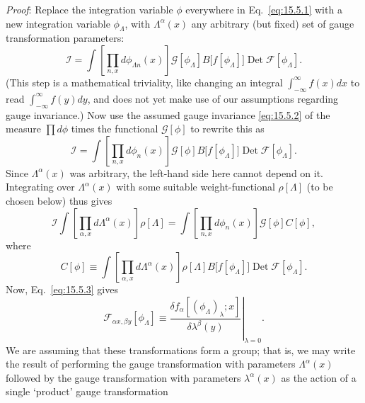 \emph{Proof}: Replace the integration variable $\phi$ everywhere in
Eq.~\eqref{eq:15.5.1} with a new integration variable $\phi_\Lambda$, with
$\Lambda^\alpha(x)$ any arbitrary (but fixed) set of gauge transformation
parameters:
\begin{equation}
  \mathcal I=\int\left[\prod_{n,x}d\phi_{\Lambda n}(x)\right]
  \mathcal G[\phi_\Lambda]B\bigl[f[\phi_\Lambda]\bigr]
  \operatorname{Det}\mathcal F[\phi_\Lambda].
  \tag{15.5.8}\label{eq:15.5.8}
\end{equation}
(This step is a mathematical triviality, like changing an integral
$\int_{-\infty}^{\infty}f(x)dx$ to read
$\int_{-\infty}^{\infty}f(y)dy$, and does not yet make use of our assumptions
regarding gauge invariance.) Now use the assumed gauge invariance
\eqref{eq:15.5.2} of the measure $\prod d\phi$ times the functional
$\mathcal G[\phi]$ to rewrite this as
\begin{equation}
  \mathcal I=\int\left[\prod_{n,x}d\phi_n(x)\right]
  \mathcal G[\phi]B\bigl[f[\phi_\Lambda]\bigr]
  \operatorname{Det}\mathcal F[\phi_\Lambda].
  \tag{15.5.9}\label{eq:15.5.9}
\end{equation}
Since $\Lambda^\alpha(x)$ was arbitrary, the left-hand side here cannot depend
on it. Integrating over $\Lambda^\alpha(x)$ with some suitable
weight-functional $\rho[\Lambda]$ (to be chosen below) thus gives
\begin{equation}
  \mathcal I\int\left[\prod_{\alpha,x}d\Lambda^\alpha(x)\right]\rho[\Lambda]
  =\int\left[\prod_{n,x}d\phi_n(x)\right]\mathcal G[\phi]C[\phi],
  \tag{15.5.10}\label{eq:15.5.10}
\end{equation}
where
\begin{equation}
  C[\phi]\equiv\int\left[\prod_{\alpha,x}d\Lambda^\alpha(x)\right]
  \rho[\Lambda]B\bigl[f[\phi_\Lambda]\bigr]
  \operatorname{Det}\mathcal F[\phi_\Lambda].
  \tag{15.5.11}\label{eq:15.5.11}
\end{equation}
Now, Eq.~\eqref{eq:15.5.3} gives
\begin{equation}
  \mathcal F_{\alpha x,\beta y}[\phi_\Lambda]
  \equiv\left.\frac{\delta f_\alpha[(\phi_\Lambda)_\lambda;x]}
  {\delta\lambda^\beta(y)}\right|_{\lambda=0}.
  \tag{15.5.12}\label{eq:15.5.12}
\end{equation}
We are assuming that these transformations form a group; that is, we may
write the result of performing the gauge transformation with parameters
$\Lambda^\alpha(x)$ followed by the gauge transformation with parameters
$\lambda^\alpha(x)$ as the action of a single `product' gauge transformation
